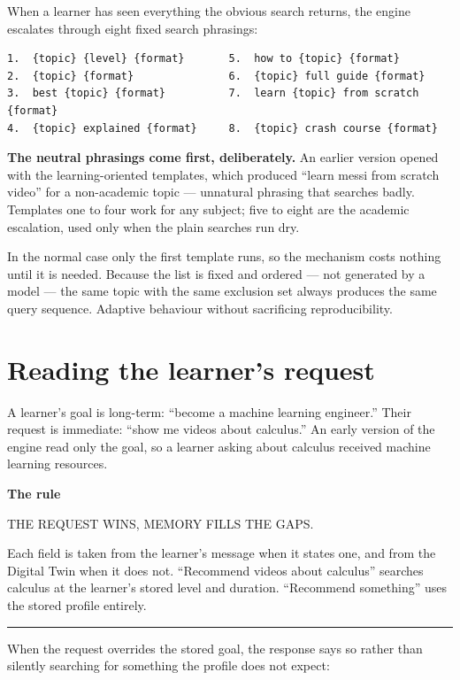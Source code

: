 \documentclass[11pt,a4paper]{article}
\newenvironment{callout}[1]
  {\par\vspace{8pt}\noindent
   \begin{lrbox}{\calloutbox}
   \begin{minipage}{\dimexpr\textwidth-2\fboxsep-8pt\relax}
   \vspace{4pt}
   {\bfseries\color{navy}#1}\par\vspace{4pt}}
  {\vspace{4pt}\end{minipage}%
   \end{lrbox}%
   \noindent\textcolor{navy}{\rule[-\dp\calloutbox]{3pt}{\dimexpr\ht\calloutbox+\dp\calloutbox\relax}}%
   \colorbox{headshade}{\usebox{\calloutbox}}%
   \par\vspace{10pt}}
\begin{document}
When a learner has seen everything the obvious search returns, the engine
escalates through eight fixed search phrasings:

\begin{lstlisting}
1.  {topic} {level} {format}       5.  how to {topic} {format}
2.  {topic} {format}               6.  {topic} full guide {format}
3.  best {topic} {format}          7.  learn {topic} from scratch {format}
4.  {topic} explained {format}     8.  {topic} crash course {format}
\end{lstlisting}

\textbf{The neutral phrasings come first, deliberately.} An earlier version
opened with the learning-oriented templates, which produced ``learn messi from
scratch video'' for a non-academic topic --- unnatural phrasing that searches
badly. Templates one to four work for any subject; five to eight are the
academic escalation, used only when the plain searches run dry.

In the normal case only the first template runs, so the mechanism costs
nothing until it is needed. Because the list is fixed and ordered --- not
generated by a model --- the same topic with the same exclusion set always
produces the same query sequence. Adaptive behaviour without sacrificing
reproducibility.

\newpage
\section{Reading the learner's request}

A learner's goal is long-term: ``become a machine learning engineer.'' Their
request is immediate: ``show me videos about calculus.'' An early version of
the engine read only the goal, so a learner asking about calculus received
machine learning resources.

\begin{callout}{The rule}
THE REQUEST WINS, MEMORY FILLS THE GAPS.
\par\vspace{4pt}
Each field is taken from the learner's message when it states one, and from
the Digital Twin when it does not. ``Recommend videos about calculus''
searches calculus at the learner's stored level and duration. ``Recommend
something'' uses the stored profile entirely.
\end{callout}

When the request overrides the stored goal, the response says so rather than
silently searching for something the profile does not expect:
\end{document}
